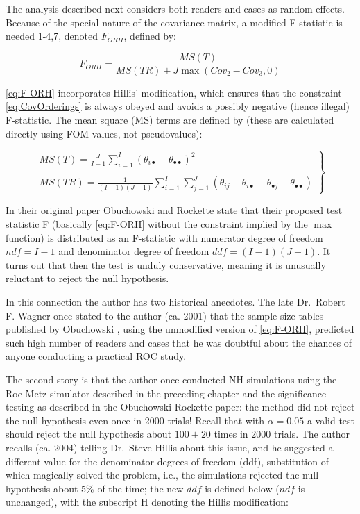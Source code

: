 \documentclass[
]{book}
\begin{document}
The analysis described next considers both readers and cases as random effects. Because of the special nature of the covariance matrix, a modified F-statistic is needed 1-4,7, denoted \(F_{ORH}\), defined by:

\begin{equation}
F_{ORH}=\frac{MS(T)}{MS(TR)+J\max(Cov_2-Cov_3,0)}
\label{eq:F-ORH}
\end{equation}

\eqref{eq:F-ORH} incorporates Hillis' modification, which ensures that the constraint \eqref{eq:CovOrderings} is always obeyed and avoids a possibly negative (hence illegal) F-statistic. The mean square (MS) terms are defined by (these are calculated directly using FOM values, not pseudovalues):

\begin{equation}
\left.\begin{matrix}
MS(T)=\frac{J}{I-1}\sum_{i=1}^{I}(\theta_{i\bullet}-\theta_{\bullet\bullet})^2\\
\\ 
MS(TR)=\frac{1}{(I-1)(J-1)}\sum_{i=1}^{I}\sum_{j=1}^{J}(\theta_{ij}-\theta_{i\bullet}-\theta_{\bullet j}+\theta_{\bullet\bullet})
\end{matrix}\right\}
\label{eq:MS-ORH}
\end{equation}

In their original paper \citep{RN1450} Obuchowski and Rockette state that their proposed test statistic F (basically \eqref{eq:F-ORH} without the constraint implied by the \(\max\) function) is distributed as an F-statistic with numerator degree of freedom \(ndf=I-1\) and denominator degree of freedom \(ddf=(I-1)(J-1)\). It turns out that then the test is unduly conservative, meaning it is unusually reluctant to reject the null hypothesis.

In this connection the author has two historical anecdotes. The late Dr.~Robert F. Wagner once stated to the author (ca. 2001) that the sample-size tables published by Obuchowski \citep{RN1971, RN1972}, using the unmodified version of \eqref{eq:F-ORH}, predicted such high number of readers and cases that he was doubtful about the chances of anyone conducting a practical ROC study.

The second story is that the author once conducted NH simulations using the Roe-Metz simulator described in the preceding chapter and the significance testing as described in the Obuchowski-Rockette paper: the method did not reject the null hypothesis even once in 2000 trials! Recall that with \(\alpha = 0.05\) a valid test should reject the null hypothesis about \(100\pm20\) times in 2000 trials. The author recalls (ca. 2004) telling Dr.~Steve Hillis about this issue, and he suggested a different value for the denominator degrees of freedom (ddf), substitution of which magically solved the problem, i.e., the simulations rejected the null hypothesis about 5\% of the time; the new \(ddf\) is defined below (\(ndf\) is unchanged), with the subscript H denoting the Hillis modification:
\end{document}
